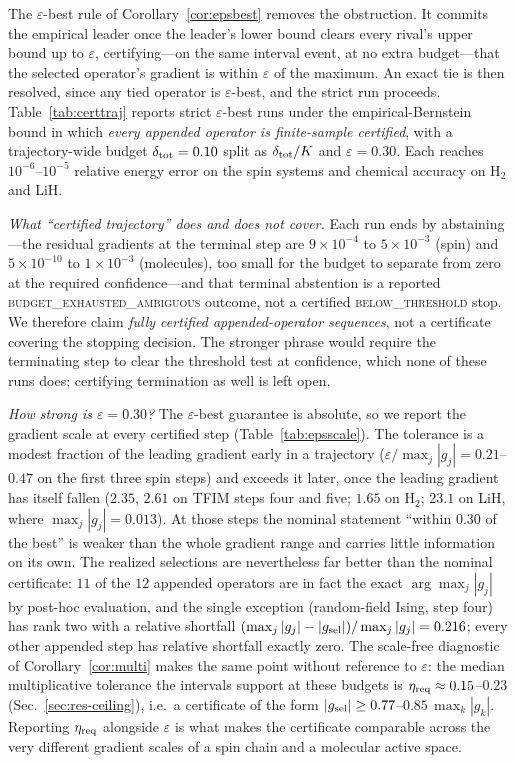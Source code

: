 \documentclass[aps,pra,reprint,superscriptaddress,nofootinbib,floatfix]{revtex4-2}
\begin{document}
The $\varepsilon$-best rule of Corollary~\ref{cor:epsbest} removes the obstruction. It commits the empirical leader once the leader's lower bound clears every rival's upper bound up to $\varepsilon$, certifying---on the same interval event, at no extra budget---that the selected operator's gradient is within $\varepsilon$ of the maximum. An exact tie is then resolved, since any tied operator is $\varepsilon$-best, and the strict run proceeds. Table~\ref{tab:certtraj} reports strict $\varepsilon$-best runs under the empirical-Bernstein bound in which \emph{every appended operator is finite-sample certified}, with a trajectory-wide budget $\delta_{\rm tot}=0.10$ split as $\delta_{\rm tot}/K$ and $\varepsilon=0.30$. Each reaches $10^{-6}$--$10^{-5}$ relative energy error on the spin systems and chemical accuracy on H$_2$ and LiH.

\emph{What ``certified trajectory'' does and does not cover.} Each run ends by abstaining---the residual gradients at the terminal step are $9\times10^{-4}$ to $5\times10^{-3}$ (spin) and $5\times10^{-10}$ to $1\times10^{-3}$ (molecules), too small for the budget to separate from zero at the required confidence---and that terminal abstention is a reported \textsc{budget\_exhausted\_ambiguous} outcome, not a certified \textsc{below\_threshold} stop. We therefore claim \emph{fully certified appended-operator sequences}, not a certificate covering the stopping decision. The stronger phrase would require the terminating step to clear the threshold test at confidence, which none of these runs does; certifying termination as well is left open.

\emph{How strong is $\varepsilon=0.30$?} The $\varepsilon$-best guarantee is absolute, so we report the gradient scale at every certified step (Table~\ref{tab:epsscale}). The tolerance is a modest fraction of the leading gradient early in a trajectory ($\varepsilon/\max_j|g_j|=0.21$--$0.47$ on the first three spin steps) and exceeds it later, once the leading gradient has itself fallen ($2.35$, $2.61$ on TFIM steps four and five; $1.65$ on H$_2$; $23.1$ on LiH, where $\max_j|g_j|=0.013$). At those steps the nominal statement ``within $0.30$ of the best'' is weaker than the whole gradient range and carries little information on its own. The realized selections are nevertheless far better than the nominal certificate: $11$ of the $12$ appended operators are in fact the exact $\arg\max_j|g_j|$ by post-hoc evaluation, and the single exception (random-field Ising, step four) has rank two with a relative shortfall $(\max_j|g_j|-|g_{\rm sel}|)/\max_j|g_j|=0.216$; every other appended step has relative shortfall exactly zero. The scale-free diagnostic of Corollary~\ref{cor:multi} makes the same point without reference to $\varepsilon$: the median multiplicative tolerance the intervals support at these budgets is $\eta_{\rm req}\approx0.15$--$0.23$ (Sec.~\ref{sec:res-ceiling}), i.e.\ a certificate of the form $|g_{\rm sel}|\ge0.77$--$0.85\,\max_k|g_k|$. Reporting $\eta_{\rm req}$ alongside $\varepsilon$ is what makes the certificate comparable across the very different gradient scales of a spin chain and a molecular active space.
\end{document}
